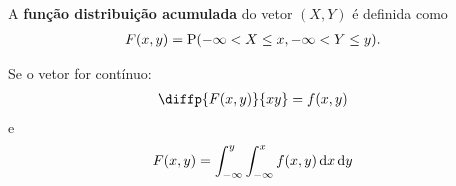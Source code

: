 \begin{definition}
    A \textbf{função distribuição acumulada} do vetor $(X, Y)$
    é definida como
    \begin{align}
        F(x, y) &= \operatorname{P}(-\infty < X \le x, -\infty < Y \le y).
        \label{eq:ch03-fda-2d}
    \end{align}
    
    Se o vetor for contínuo:
    \begin{align}
        \diffp{F(x, y)}{xy} &= f(x, y) \label{eq:ch03-fdp-diff-fda}
    \end{align}
    e
    \begin{align}
        F(x, y) &= \int_{-\infty}^y \int_{-\infty}^x
            f(x, y) \,\mathrm{d} x \,\mathrm{d} y \label{eq:ch03-fda-int-fdp}
    \end{align}
\end{definition}
